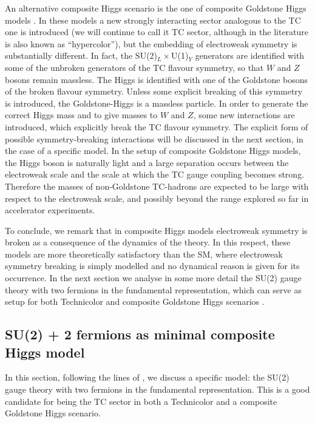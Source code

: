 An alternative composite Higgs scenario is the one of composite Goldstone Higgs models \cite{Kaplan:1983sm,Kaplan:1983fs}. In these models a new strongly interacting sector analogous to the TC one is introduced (we will continue to call it TC sector, although in the literature is also known as ``hypercolor''), but the embedding of electroweak symmetry is substantially different. In fact, the SU(2)$_L\times$U(1)$_Y$ generators are identified with some of the unbroken generators of the TC flavour symmetry, so that $W$ and $Z$ bosons remain massless. The Higgs is identified with one of the Goldstone bosons of the broken flavour symmetry. Unless some explicit breaking of this symmetry is introduced, the Goldstone-Higgs is a massless particle. In order to generate the correct Higgs mass and to give masses to $W$ and $Z$, some new interactions are introduced, which explicitly break the TC flavour symmetry. The explicit form of possible symmetry-breaking interactions will be discussed in the next section, in the case of a specific model. In the setup of composite Goldstone Higgs models, the Higgs boson is naturally light and a large separation occurs between the electroweak scale and the scale at which the TC gauge coupling becomes strong. Therefore the masses of non-Goldstone TC-hadrons are expected to be large with respect to the electroweak scale, and possibly beyond the range explored so far in accelerator experiments.

To conclude, we remark that in composite Higgs models electroweak symmetry is broken as a consequence of the dynamics of the theory. In this respect, these models are more theoretically satisfactory than the SM, where electroweak symmetry breaking is simply modelled and no dynamical reason is given for its occurrence. In the next section we analyse in some more detail the SU(2) gauge theory with two fermions in the fundamental representation, which can serve as setup for both Technicolor and composite Goldstone Higgs scenarios \cite{Cacciapaglia:2014uja}.


\subsection{SU(2) + 2 fermions as minimal composite Higgs model}
\label{SU2_composite_Higgs}

In this section, following the lines of \cite{Cacciapaglia:2014uja}, we discuss a specific model: the SU(2) gauge theory with two fermions in the fundamental representation. This is a good candidate for being the TC sector in both a Technicolor and a composite Goldstone Higgs scenario.


